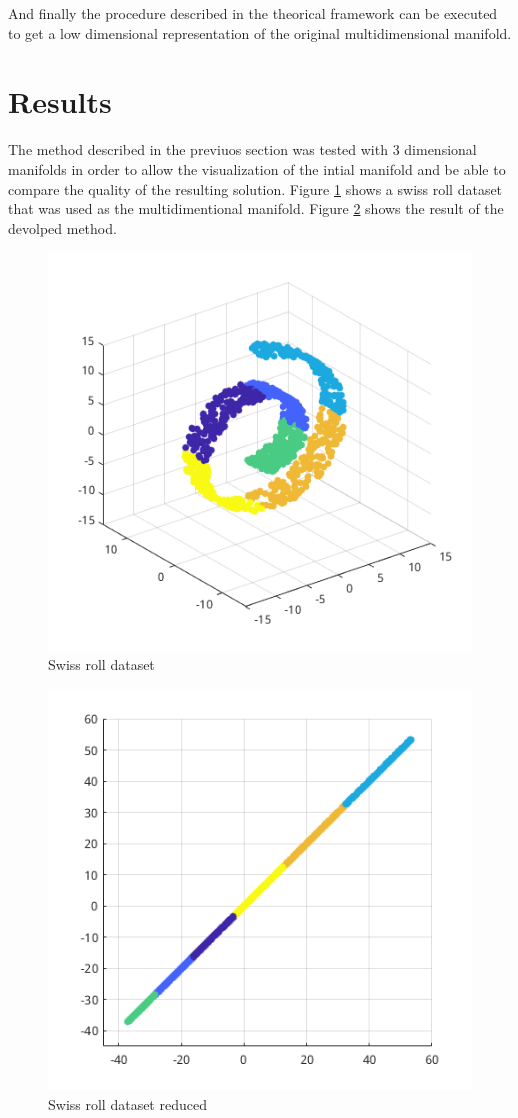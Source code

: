 \documentclass[12pt,journal]{IEEEtran}
\begin{document}
\vspace{0.5cm}

And finally the procedure described in the theorical framework can be executed
to get a low dimensional representation of the original multidimensional
manifold.

\section{Results}

The method described in the previuos section was tested with 3 dimensional
manifolds in order to allow the visualization of the intial manifold and be able
to compare the quality of the resulting solution. Figure \ref{swiss} shows
a swiss roll dataset that was used as the multidimentional manifold. Figure
\ref{swiss_res} shows the result of the devolped method.

\begin{figure}[H]
    \centering
    \includegraphics[width=0.7\linewidth]{images/swiss_roll.png}
    \caption{Swiss roll dataset}
    \label{swiss}
\end{figure}

\begin{figure}[H]
    \centering
    \includegraphics[width=0.7\linewidth]{images/swiss_roll_result.png}
    \caption{Swiss roll dataset reduced}
    \label{swiss_res}
\end{figure}
\end{document}
